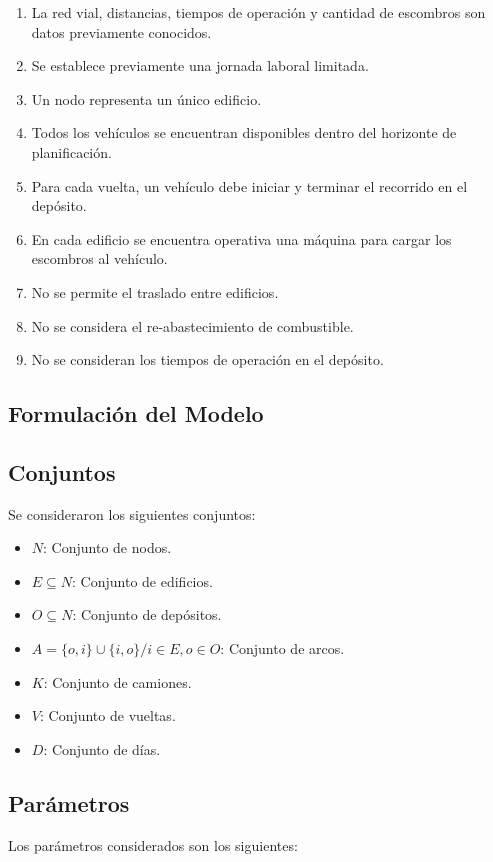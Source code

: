 \documentclass[letterpaper,conference]{IEEEtran}
\begin{document}
\begin{enumerate}[label=\roman*.]
	\item La red vial, distancias, tiempos de operación y cantidad de escombros son datos previamente conocidos.
	\item Se establece previamente una jornada laboral limitada.	
	\item Un nodo representa un único edificio.
	\item Todos los vehículos se encuentran disponibles dentro del horizonte de planificación.	
	\item Para cada vuelta, un vehículo debe iniciar y terminar el recorrido en el depósito.
	\item En cada edificio se encuentra operativa una máquina para cargar los escombros al vehículo.	
	\item No se permite el traslado entre edificios.	
	\item No se considera el re-abastecimiento de combustible.
	\item No se consideran los tiempos de operación en el depósito.
\end{enumerate}

\subsection{Formulación del Modelo}

\subsection{Conjuntos}
Se consideraron los siguientes conjuntos:
\begin{itemize}
	\item $N$: Conjunto de nodos.
	\item $E \subseteq N$: Conjunto de edificios.
	\item $O \subseteq N$: Conjunto de depósitos.
	\item $A = \{o,i\} \cup \{i,o\} / i \in E, o \in O$: Conjunto de arcos.
	\item $K$: Conjunto de camiones.
	\item $V$: Conjunto de vueltas.
	\item $D$: Conjunto de días.
\end{itemize}

\subsection{Parámetros}
Los parámetros considerados son los siguientes:
\end{document}
